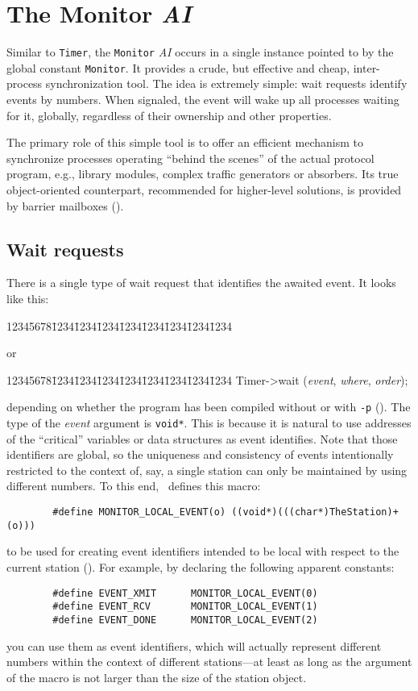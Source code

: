 \section{The Monitor {\em AI\/}}
\label{rm_mo}

Similar to {\tt Timer}, the {\tt Monitor} {\em AI\/} occurs in a single
instance pointed to by the global constant {\tt Monitor}.
It provides a crude, but effective and cheap,
inter-process synchronization tool.
The idea is extremely simple: wait requests identify events by numbers.
When signaled, the event will wake up all processes waiting for it, globally,
regardless of their ownership and other properties.

The primary role of this simple tool is to offer an efficient mechanism to
synchronize processes operating ``behind the scenes'' of the actual
protocol program, e.g., library modules, complex traffic generators or
absorbers.
Its true object-oriented counterpart, recommended for higher-level solutions,
is provided by barrier mailboxes ().

\subsection{Wait requests}
\label{rm_mo_wr}

There is a single type of wait request that identifies the awaited event.
It looks like this:
{\tt\begin{tabbing}
12345678\=1234\=1234\=1234\=1234\=1234\=1234\=1234\=1234\kill
{}
\end{tabbing}}
\noindent
or
{\tt\begin{tabbing}
12345678\=1234\=1234\=1234\=1234\=1234\=1234\=1234\=1234\kill
\>Timer->wait ({\em event}, {\em where}, {\em order});
\end{tabbing}}
\noindent
depending on whether the program has been compiled without or with {\tt -p}
().
The type of the {\em event\/} argument is {\tt void*}.
This is because it is natural to use addresses of the ``critical'' variables
or data structures as event identifies.
Note that those identifiers are global, so the uniqueness and consistency of
events intentionally restricted to the context of, say, a single station
can only be maintained by using different numbers.
To this end, \smurph\ defines this macro:
\begin{verbatim}
        #define MONITOR_LOCAL_EVENT(o) ((void*)(((char*)TheStation)+(o)))
\end{verbatim}
\noindent
to be used for creating event identifiers
intended to be local with respect to the
current station ().
For example, by declaring the following apparent constants:
\begin{verbatim}
        #define EVENT_XMIT      MONITOR_LOCAL_EVENT(0)
        #define EVENT_RCV       MONITOR_LOCAL_EVENT(1)
        #define EVENT_DONE      MONITOR_LOCAL_EVENT(2)
\end{verbatim}
\noindent
you can use them as event identifiers, which will actually represent different
numbers within the context of different stations---at least as long as the
argument of the macro is not larger than the size of the station object.

